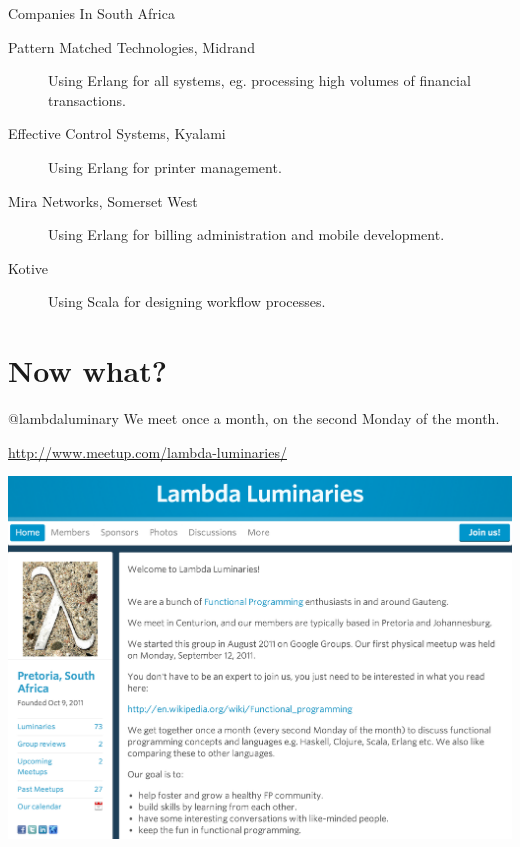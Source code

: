 \documentclass[mathserif]{beamer}
\begin{document}
\begin{frame}{Companies In South Africa}

  \begin{description}
  \item[Pattern Matched Technologies, Midrand] Using Erlang for all systems,
    eg. processing high volumes of financial transactions.
  \item[Effective Control Systems, Kyalami] Using Erlang for printer
    management.
  \item[Mira Networks, Somerset West] Using Erlang for billing
    administration and mobile development.
  \item[Kotive] Using Scala for designing workflow processes.
  \end{description}

\end{frame}

\section{Now what?}

\begin{frame}{@lambdaluminary}
  We meet once a month, on the second Monday of the month.

  \url{http://www.meetup.com/lambda-luminaries/}
  \begin{center}
    \includegraphics[scale=0.2]{img/ScreenShotLambdaLuminaries.png}
  \end{center}
\end{frame}
\end{document}
